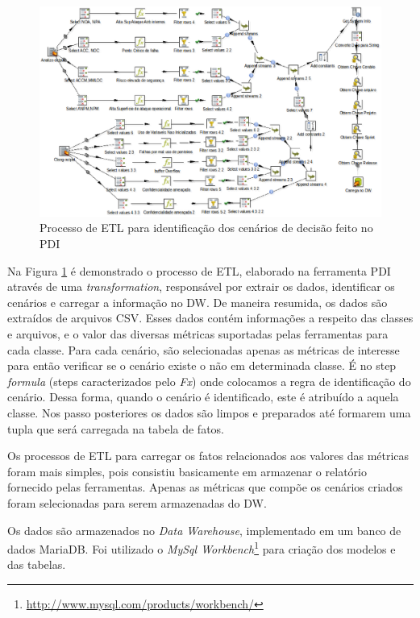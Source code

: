 \begin{landscape}

\begin{figure}[H]
 	\centering
 		\includegraphics[scale=0.7]{figuras/dw-etlpdi}
 		\caption{Processo de ETL para identificação dos cenários de decisão feito no PDI}
 		\label{dw-etl-pdi}
 \end{figure}

\end{landscape}
Na Figura \ref{dw-etl-pdi} é demonstrado o processo de ETL, elaborado na ferramenta PDI através de uma \emph{transformation}, responsável por extrair os dados, identificar os cenários e carregar a informação no DW. De maneira resumida, os dados são extraídos de arquivos CSV. Esses dados contém informações a respeito das classes e arquivos, e o valor das diversas métricas suportadas pelas ferramentas para cada classe. Para cada cenário, são selecionadas apenas as métricas de interesse para então verificar se o cenário existe o não em determinada classe. É no step \emph{formula} (steps caracterizados pelo \emph{Fx}) onde colocamos a regra de identificação do cenário. Dessa forma, quando o cenário é identificado, este é atribuído a aquela classe. Nos passo posteriores os dados são limpos e preparados até formarem uma tupla que será carregada na tabela de fatos.


Os processos de ETL para carregar os fatos relacionados aos valores das métricas foram mais simples, pois consistiu basicamente em armazenar o relatório fornecido pelas ferramentas. Apenas as métricas que compõe os cenários criados foram selecionadas para serem armazenadas do DW.


Os dados são armazenados no \emph{Data Warehouse}, implementado em um banco de dados MariaDB. Foi utilizado o \emph{MySql Workbench}\footnote{\url{http://www.mysql.com/products/workbench/}} para criação dos modelos e das tabelas.



